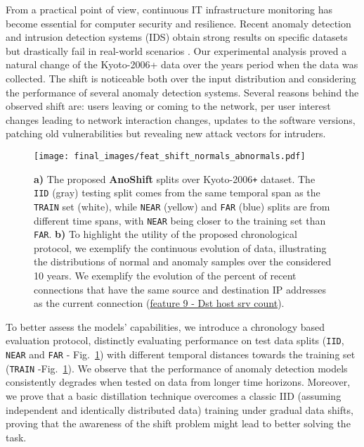 \documentclass{article}
\begin{document}
From a practical point of view, continuous IT infrastructure monitoring has become essential for computer security and resilience. Recent anomaly detection and intrusion detection systems (IDS) obtain strong results on specific datasets but drastically fail in real-world scenarios \cite{nids_generalization}. Our experimental analysis proved a natural change of the Kyoto-2006+ data over the  years period when the data was collected. The shift is noticeable both over the input distribution and considering the performance of several anomaly detection systems. Several reasons behind the observed shift are: users leaving or coming to the network, per user interest changes leading to network interaction changes, updates to the software versions, patching old vulnerabilities but revealing new attack vectors for intruders.







\begin{figure}[t]
    \begin{center}
        \texttt{[image: final\_images/feat\_shift\_normals\_abnormals.pdf]}
    \end{center}
    \caption{\textbf{a)} The proposed \textbf{AnoShift} splits over Kyoto-2006\texttt{+} dataset. The \texttt{IID} (gray) testing split comes from the same temporal span as the \texttt{TRAIN} set (white), while \texttt{NEAR} (yellow) and \texttt{FAR} (blue) splits are from different time spans, with \texttt{NEAR} being closer to the training set than \texttt{FAR}. \textbf{b)} To highlight the utility of the proposed chronological protocol, we exemplify the continuous evolution of data, illustrating the distributions of normal and anomaly samples over the considered 10 years. We exemplify the evolution of the percent of recent connections that have the same source and destination IP addresses as the current connection (\href{http://www.takakura.com/Kyoto_data/BenchmarkData-Description-New.pdf}{feature 9 - Dst host srv count}).}
\label{fig:anoshift_splits_feat_distrib}
\end{figure}


To better assess the models' capabilities, we introduce a chronology based evaluation protocol, distinctly evaluating performance on test data splits (\texttt{IID}, \texttt{NEAR} and \texttt{FAR} - Fig.~\ref{fig:anoshift_splits_feat_distrib}) with different temporal distances towards the training set (\texttt{TRAIN} -Fig.~\ref{fig:anoshift_splits_feat_distrib}). We observe that the performance of anomaly detection models consistently degrades when tested on data from longer time horizons. Moreover, we prove that a basic distillation technique overcomes a classic IID (assuming independent and identically distributed data) training under gradual data shifts, proving that the awareness of the shift problem might lead to better solving the task.
\end{document}
